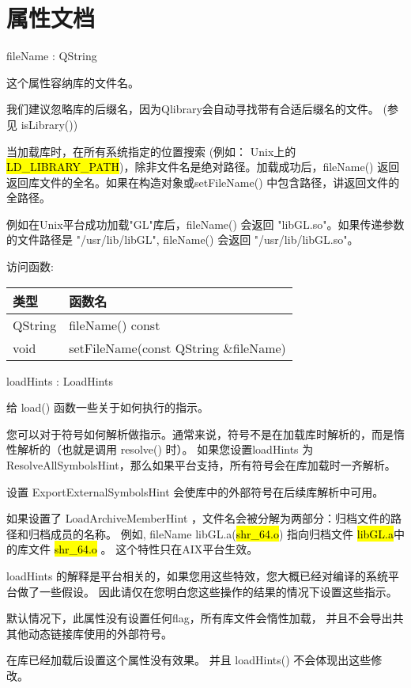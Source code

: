 \section{属性文档}

fileName : QString

这个属性容纳库的文件名。

我们建议忽略库的后缀名，因为Qlibrary会自动寻找带有合适后缀名的文件。 (参见 isLibrary())

当加载库时，在所有系统指定的位置搜索 (例如： Unix上的 \hl{LD\_LIBRARY\_PATH})，除非文件名是绝对路径。加载成功后，fileName() 返回返回库文件的全名。如果在构造对象或setFileName() 中包含路径，讲返回文件的全路径。

例如在Unix平台成功加载"GL"库后，fileName() 会返回 "libGL.so"。如果传递参数的文件路径是 "/usr/lib/libGL", fileName() 会返回 "/usr/lib/libGL.so"。

访问函数:

\begin{tabular}{|l|l|}
\hline
类型& 	函数名\\
\hline
QString& 	fileName() const\\
\hline
void& 	setFileName(const QString \&fileName)\\
\hline
\end{tabular}

loadHints : LoadHints

给 load() 函数一些关于如何执行的指示。

您可以对于符号如何解析做指示。通常来说，符号不是在加载库时解析的，而是惰性解析的（也就是调用 resolve() 时）。
如果您设置loadHints 为ResolveAllSymbolsHint，那么如果平台支持，所有符号会在库加载时一齐解析。

设置 ExportExternalSymbolsHint 会使库中的外部符号在后续库解析中可用。

如果设置了 LoadArchiveMemberHint ，文件名会被分解为两部分：归档文件的路径和归档成员的名称。
例如, fileName libGL.a(\hl{shr\_64.o}) 指向归档文件 \hl{libGL.a}中的库文件 \hl{shr\_64.o} 。
这个特性只在AIX平台生效。

loadHints 的解释是平台相关的，如果您用这些特效，您大概已经对编译的系统平台做了一些假设。
因此请仅在您明白您这些操作的结果的情况下设置这些指示。

默认情况下，此属性没有设置任何flag，所有库文件会惰性加载，
并且不会导出共其他动态链接库使用的外部符号。

\begin{notice}
在库已经加载后设置这个属性没有效果。 并且 loadHints() 不会体现出这些修
改。
\end{notice}

